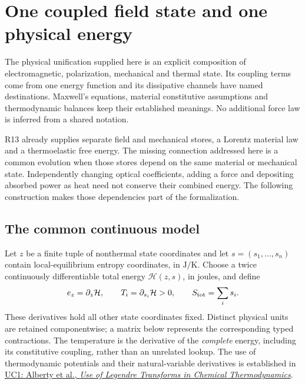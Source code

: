 \section{One coupled field state and one physical energy}
\label{sec:r14-coupling}
The physical unification supplied here is an explicit composition of
electromagnetic, polarization, mechanical and thermal state. Its coupling
terms come from one energy function and its dissipative channels have named
destinations. Maxwell's equations, material constitutive assumptions and
thermodynamic balances keep their established meanings. No additional force
law is inferred from a shared notation.

R13 already supplies separate field and mechanical stores, a Lorentz material
law and a thermoelastic free energy. The missing connection addressed here
is a common evolution when those stores depend on the same material or
mechanical state. Independently changing optical coefficients, adding a force
and depositing absorbed power as heat need not conserve their combined energy.
The following construction makes those dependencies part of the formalization.

\subsection{The common continuous model}
Let $z$ be a finite tuple of nonthermal state coordinates and let
$s=(s_1,\ldots,s_n)$ contain local-equilibrium entropy coordinates, in
$\mathrm{J/K}$. Choose a twice continuously differentiable total energy
$\mathcal H(z,s)$, in joules, and define
\begin{equation}
 e_z=\partial_z\mathcal H,\qquad
 T_i=\partial_{s_i}\mathcal H>0,\qquad
 S_{\rm tot}=\sum_i s_i.
 \label{eq:r14-conjugates}
\end{equation}
These derivatives hold all other state coordinates fixed. Distinct physical
units are retained componentwise; a matrix below represents the corresponding
typed contractions. The temperature is the derivative of the \emph{complete}
energy, including its constitutive coupling, rather than an unrelated lookup.
The use of thermodynamic potentials and their natural-variable derivatives is
established in
\href{https://www.nist.gov/publications/use-legendre-transforms-chemical-thermodynamics}
{UC1: Alberty et al., \emph{Use of Legendre Transforms in Chemical Thermodynamics}}.

